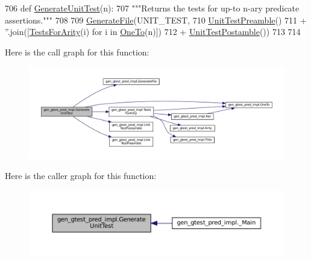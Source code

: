 \begin{DoxyCode}
706 \textcolor{keyword}{def }\hyperlink{namespacegen__gtest__pred__impl_acbd42b5b7fb7ddbb06a4dd58fc37e9ed}{GenerateUnitTest}(n):
707   \textcolor{stringliteral}{"""Returns the tests for up-to n-ary predicate assertions."""}
708 
709   \hyperlink{namespacegen__gtest__pred__impl_a16210fe365dfd176e04aa2578ac5a8d9}{GenerateFile}(UNIT\_TEST,
710                \hyperlink{namespacegen__gtest__pred__impl_ae52dc86461d1b666c7b658a8c27c69f9}{UnitTestPreamble}()
711                + \textcolor{stringliteral}{''}.join([\hyperlink{namespacegen__gtest__pred__impl_ab0da913fa15e5695d5bb2dd1de5dec57}{TestsForArity}(i) \textcolor{keywordflow}{for} i \textcolor{keywordflow}{in} \hyperlink{namespacegen__gtest__pred__impl_a7920598d51c9dded76a4ef9ffde339e4}{OneTo}(n)])
712                + \hyperlink{namespacegen__gtest__pred__impl_a57b922f50d0807896496dcd883c1f098}{UnitTestPostamble}())
713 
714 
\end{DoxyCode}
Here is the call graph for this function\+:
\nopagebreak
\begin{figure}[H]
\begin{center}
\leavevmode
\includegraphics[width=350pt]{namespacegen__gtest__pred__impl_acbd42b5b7fb7ddbb06a4dd58fc37e9ed_cgraph}
\end{center}
\end{figure}
Here is the caller graph for this function\+:
\nopagebreak
\begin{figure}[H]
\begin{center}
\leavevmode
\includegraphics[width=350pt]{namespacegen__gtest__pred__impl_acbd42b5b7fb7ddbb06a4dd58fc37e9ed_icgraph}
\end{center}
\end{figure}
\mbox{\label{namespacegen__gtest__pred__impl_a3d40c7ef70cf4d46e56c9612f34027bf}} 
